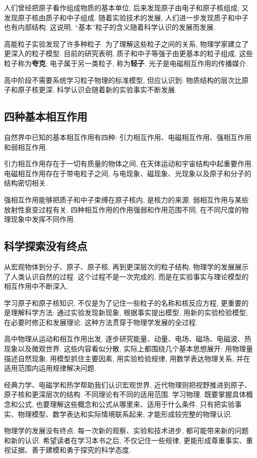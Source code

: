 \documentclass[11pt,a4paper]{ctexbook}
\begin{document}
人们曾经把原子看作组成物质的基本单位, 后来发现原子由电子和原子核组成; 又发现原子核由质子和中子组成. 随着实验技术的发展, 人们进一步发现质子和中子也有内部结构. 这说明, ``基本''粒子的含义随着科学认识的发展而发展.

高能粒子实验发现了许多种粒子. 为了理解这些粒子之间的关系, 物理学家建立了更深入的粒子模型. 目前的研究表明, 质子和中子等强子由更基本的粒子组成, 这些粒子称为\textbf{夸克}; 电子属于另一类粒子, 称为\textbf{轻子}. 光子是电磁相互作用的传播媒介.

高中阶段不需要系统学习粒子物理的标准模型, 但应认识到: 物质结构的层次比原子和原子核更深, 科学认识会随着新的实验事实不断发展.

\subsection{四种基本相互作用}

自然界中已知的基本相互作用有四种: 引力相互作用、电磁相互作用、强相互作用和弱相互作用.

引力相互作用存在于一切有质量的物体之间, 在天体运动和宇宙结构中起重要作用. 电磁相互作用存在于带电粒子之间, 与电现象、磁现象、光现象以及原子和分子的结构密切相关.

强相互作用能够把质子和中子束缚在原子核内, 是核力的来源. 弱相互作用与某些放射性衰变过程有关. 四种相互作用的作用强弱和作用范围不同, 在不同尺度的物理现象中发挥不同作用.

\subsection{科学探索没有终点}

从宏观物体到分子、原子、原子核, 再到更深层次的粒子结构, 物理学的发展展示了人类认识自然的过程. 这个过程不是一次完成的, 而是在实验事实与理论模型的相互作用中不断深入.

学习原子和原子核知识, 不仅是为了记住一些粒子的名称和核反应方程, 更重要的是理解科学方法: 通过实验发现新现象, 根据事实提出模型, 用新的实验检验模型, 在必要时修正和发展理论. 这种方法贯穿于物理学发展的全过程.

\bigskip

高中物理从运动和相互作用出发, 逐步研究能量、动量、电场、磁场、电磁波、热现象以及微观世界.
这些内容看似分散, 实际上都围绕几个基本思想展开: 用物理量描述自然现象, 用模型抓住主要因素,
用实验检验规律, 用数学表达物理关系, 并在适用范围内运用规律解决问题.

经典力学、电磁学和热学帮助我们认识宏观世界, 近代物理则把视野推进到原子、原子核和更深层次的结构.
不同理论有不同的适用范围. 学习物理, 既要掌握具体概念和公式, 也要理解这些概念和公式从哪里来、适用于什么条件.
只有把实验事实、物理模型、数学表达和实际情境联系起来, 才能形成较完整的物理认识.

物理学的发展没有终点. 每一次新的观察、实验和技术进步, 都可能带来新的问题和新的认识.
希望读者在学习本书之后, 不仅记住一些规律, 更能形成尊重事实、重视证据、善于建模和勇于探究的科学态度.
\end{document}
